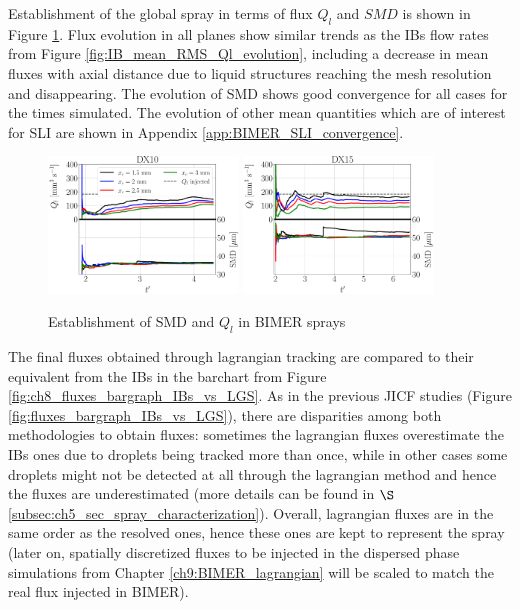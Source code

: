 Establishment of the global spray in terms of flux $Q_l$ and $SMD$ is shown in Figure \ref{fig:ch8_spray_char_establishment}.  Flux evolution in all planes show similar trends as the IBs flow rates from Figure \ref{fig:IB_mean_RMS_Ql_evolution}, including a decrease in mean fluxes with axial distance due to liquid structures reaching the mesh resolution and disappearing. The evolution of SMD shows good convergence for all cases for the times simulated. The evolution of other mean quantities which are of interest for SLI are shown in Appendix \ref{app:BIMER_SLI_convergence}.


\begin{figure}[ht]
	\centering
   \includegraphics[width=0.45\textwidth]{./part3_applications/figures_ch8_resolved/SPRAY_characterization/establishment_and_fluxes/establishment_DX10}
   \includegraphics[width=0.45\textwidth]{./part3_applications/figures_ch8_resolved/SPRAY_characterization/establishment_and_fluxes/establishment_DX15}
   \vspace*{-0.1in}
   \caption{Establishment of SMD and $Q_l$ in BIMER sprays}
\label{fig:ch8_spray_char_establishment}
\end{figure}



The final fluxes obtained through lagrangian tracking are compared to their equivalent from the IBs in the barchart from Figure \ref{fig:ch8_fluxes_bargraph_IBs_vs_LGS}. As in the previous JICF studies (Figure \ref{fig:fluxes_bargraph_IBs_vs_LGS}), there are disparities among both methodologies to obtain fluxes: sometimes the lagrangian fluxes overestimate the IBs ones due to droplets being tracked more than once, while in other cases some droplets might not be detected at all through the lagrangian method and hence the fluxes are underestimated (more details can be found in $\S$\ref{subsec:ch5_sec_spray_characterization}). Overall, lagrangian fluxes are in the same order as the resolved ones, hence these ones are kept to represent the spray (later on, spatially discretized fluxes to be injected in the dispersed phase simulations from Chapter \ref{ch9:BIMER_lagrangian} will be scaled to match the real flux injected in BIMER).




